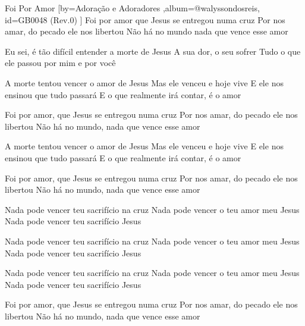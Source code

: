 \beginsong
{Foi Por Amor %
}[by={Adoração e Adoradores %
},album={@walyssondosreis},
id={GB0048 %
(Rev.0) %
}]
Foi por amor que Jesus se entregou numa cruz
Por nos amar, do pecado ele nos libertou
Não há no mundo nada que vence esse amor

Eu sei, é tão difícil entender a morte de Jesus
A sua dor, o seu sofrer
Tudo o que ele passou por mim e por você

A morte tentou vencer o amor de Jesus
Mas ele venceu e hoje vive
E ele nos ensinou que tudo passará
E o que realmente irá contar, é o amor

Foi por amor, que Jesus se entregou numa cruz
Por nos amar, do pecado ele nos libertou
Não há no mundo, nada que vence esse amor

A morte tentou vencer o amor de Jesus
Mas ele venceu e hoje vive
E ele nos ensinou que tudo passará
E o que realmente irá contar, é o amor

Foi por amor, que Jesus se entregou numa cruz
Por nos amar, do pecado ele nos libertou
Não há no mundo, nada que vence esse amor

Nada pode vencer teu sacrifício na cruz
Nada pode vencer o teu amor meu Jesus
Nada pode vencer teu sacrifício Jesus

Nada pode vencer teu sacrifício na cruz
Nada pode vencer o teu amor meu Jesus
Nada pode vencer teu sacrifício Jesus

Nada pode vencer teu sacrifício na cruz
Nada pode vencer o teu amor meu Jesus
Nada pode vencer teu sacrifício Jesus

Foi por amor, que Jesus se entregou numa cruz
Por nos amar, do pecado ele nos libertou
Não há no mundo, nada que vence esse amor


